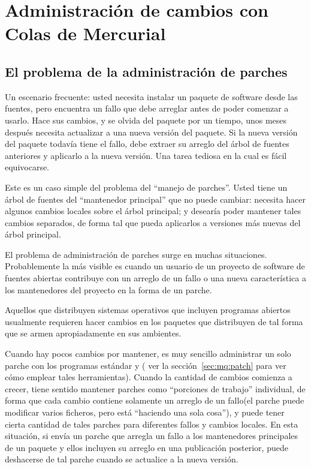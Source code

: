 \chapter{Administración de cambios con Colas de Mercurial}
\label{chap:mq}

\section{El problema de la administración de parches}
\label{sec:mq:patch-mgmt}

Un escenario frecuente: usted necesita instalar un paquete de software
desde las fuentes, pero encuentra un fallo que debe arreglar antes de
poder comenzar a usarlo.  Hace sus cambios, y se olvida del paquete
por un tiempo, unos meses después necesita actualizar a una nueva
versión del paquete.  Si la nueva versión del paquete todavía tiene el
fallo, debe extraer su arreglo del árbol de fuentes anteriores y
aplicarlo a la nueva versión.  Una tarea tediosa en la cual es fácil
equivocarse.

Este es un caso simple del problema del ``manejo de parches''.  Usted
tiene un árbol de fuentes del ``mantenedor principal'' que no puede
cambiar: necesita hacer algunos cambios locales sobre el árbol
principal; y desearía poder mantener tales cambios separados, de forma
tal que pueda aplicarlos a versiones más nuevas del árbol principal.

El problema de administración de parches surge en muchas situaciones.
Probablemente la más visible es cuando un usuario de un proyecto de
software de fuentes abiertas contribuye con un arreglo de un fallo o
una nueva característica a los mantenedores del proyecto en la forma
de un parche.

Aquellos que distribuyen sistemas operativos que incluyen programas
abiertos usualmente requieren hacer cambios en los paquetes que
distribuyen de tal forma que se armen apropiadamente en sus ambientes.

Cuando hay pocos cambios por mantener, es muy sencillo administrar un
solo parche con los programas estándar  y
( ver la sección~\ref{sec:mq:patch} para ver cómo
emplear tales herramientas). Cuando la cantidad de cambios comienza a
crecer, tiene sentido mantener parches como ``porciones de trabajo''
individual, de forma que cada cambio contiene solamente un arreglo de
un fallo(el parche puede modificar varios ficheros, pero está
``haciendo una sola cosa''), y puede tener cierta cantidad de tales
parches para diferentes fallos y cambios locales.  En esta situación,
si envía un parche que arregla un fallo a los mantenedores principales
de un paquete y ellos incluyen su arreglo en una publicación
posterior, puede deshacerse de tal parche cuando se actualice a la
nueva versión.

